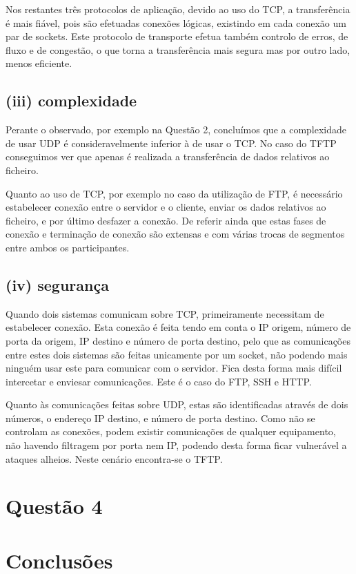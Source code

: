 \documentclass{llncs}
\begin{document}
Nos restantes três protocolos de aplicação, devido ao uso do TCP, a transferência é mais fiável, pois são efetuadas conexões lógicas, existindo em cada conexão um par de sockets. Este protocolo de transporte efetua também controlo de erros, de fluxo e de congestão, o que torna a transferência mais segura mas por outro lado, menos eficiente.

\subsection{(iii) complexidade}
Perante o observado, por exemplo na Questão 2, concluímos que a complexidade de usar UDP é consideravelmente inferior à de usar o TCP. No caso do TFTP conseguimos ver que apenas é realizada a transferência de dados relativos ao ficheiro.

Quanto ao uso de TCP, por exemplo no caso da utilização de FTP, é necessário estabelecer conexão entre o servidor e o cliente, enviar os dados relativos ao ficheiro, e por último desfazer a conexão. De referir ainda que estas fases de conexão e terminação de conexão são extensas e com várias trocas de segmentos entre ambos os participantes.

\subsection{(iv) segurança}
Quando dois sistemas comunicam sobre TCP, primeiramente necessitam de estabelecer conexão. Esta conexão é feita tendo em conta o IP origem, número de porta da origem, IP destino e número de porta destino, pelo que as comunicações entre estes dois sistemas são feitas unicamente por um socket, não podendo mais ninguém usar este para comunicar com o servidor. Fica desta forma mais difícil intercetar e enviesar comunicações. Este é o caso do FTP, SSH e HTTP.

Quanto às comunicações feitas sobre UDP, estas são identificadas através de dois números, o endereço IP destino, e número de porta destino. Como não se controlam as conexões, podem existir comunicações de qualquer equipamento, não havendo filtragem por porta nem IP, podendo desta forma ficar vulnerável a ataques alheios. Neste cenário encontra-se o TFTP.


\section{Questão 4}

\section{Conclusões}
\end{document}
